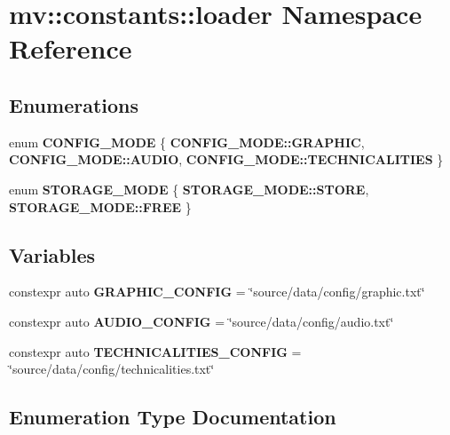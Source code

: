 \section{mv\+:\+:constants\+:\+:loader Namespace Reference}
\label{namespacemv_1_1constants_1_1loader}
\subsection*{Enumerations}
\begin{DoxyCompactItemize}
\item 
enum \textbf{ C\+O\+N\+F\+I\+G\+\_\+\+M\+O\+DE} \{ \textbf{ C\+O\+N\+F\+I\+G\+\_\+\+M\+O\+D\+E\+::\+G\+R\+A\+P\+H\+IC}, 
\textbf{ C\+O\+N\+F\+I\+G\+\_\+\+M\+O\+D\+E\+::\+A\+U\+D\+IO}, 
\textbf{ C\+O\+N\+F\+I\+G\+\_\+\+M\+O\+D\+E\+::\+T\+E\+C\+H\+N\+I\+C\+A\+L\+I\+T\+I\+ES}
 \}
\item 
enum \textbf{ S\+T\+O\+R\+A\+G\+E\+\_\+\+M\+O\+DE} \{ \textbf{ S\+T\+O\+R\+A\+G\+E\+\_\+\+M\+O\+D\+E\+::\+S\+T\+O\+RE}, 
\textbf{ S\+T\+O\+R\+A\+G\+E\+\_\+\+M\+O\+D\+E\+::\+F\+R\+EE}
 \}
\end{DoxyCompactItemize}
\subsection*{Variables}
\begin{DoxyCompactItemize}
\item 
constexpr auto \textbf{ G\+R\+A\+P\+H\+I\+C\+\_\+\+C\+O\+N\+F\+IG} = \char`\"{}source/data/config/graphic.\+txt\char`\"{}
\item 
constexpr auto \textbf{ A\+U\+D\+I\+O\+\_\+\+C\+O\+N\+F\+IG} = \char`\"{}source/data/config/audio.\+txt\char`\"{}
\item 
constexpr auto \textbf{ T\+E\+C\+H\+N\+I\+C\+A\+L\+I\+T\+I\+E\+S\+\_\+\+C\+O\+N\+F\+IG} = \char`\"{}source/data/config/technicalities.\+txt\char`\"{}
\end{DoxyCompactItemize}


\subsection{Enumeration Type Documentation}
\mbox{\label{namespacemv_1_1constants_1_1loader_a0901ff73190b844aae94a4d80c886f64}} 
